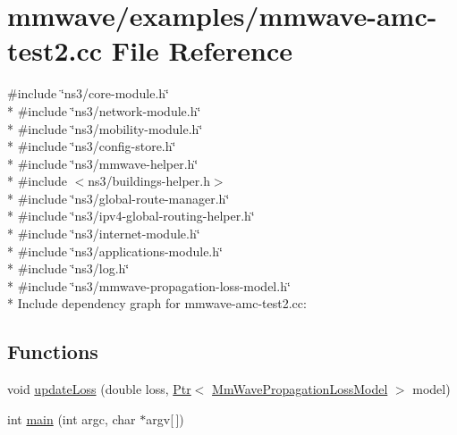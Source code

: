\hypertarget{mmwave-amc-test2_8cc}{}\section{mmwave/examples/mmwave-\/amc-\/test2.cc File Reference}
\label{mmwave-amc-test2_8cc}
{\ttfamily \#include \char`\"{}ns3/core-\/module.\+h\char`\"{}}\\*
{\ttfamily \#include \char`\"{}ns3/network-\/module.\+h\char`\"{}}\\*
{\ttfamily \#include \char`\"{}ns3/mobility-\/module.\+h\char`\"{}}\\*
{\ttfamily \#include \char`\"{}ns3/config-\/store.\+h\char`\"{}}\\*
{\ttfamily \#include \char`\"{}ns3/mmwave-\/helper.\+h\char`\"{}}\\*
{\ttfamily \#include $<$ns3/buildings-\/helper.\+h$>$}\\*
{\ttfamily \#include \char`\"{}ns3/global-\/route-\/manager.\+h\char`\"{}}\\*
{\ttfamily \#include \char`\"{}ns3/ipv4-\/global-\/routing-\/helper.\+h\char`\"{}}\\*
{\ttfamily \#include \char`\"{}ns3/internet-\/module.\+h\char`\"{}}\\*
{\ttfamily \#include \char`\"{}ns3/applications-\/module.\+h\char`\"{}}\\*
{\ttfamily \#include \char`\"{}ns3/log.\+h\char`\"{}}\\*
{\ttfamily \#include \char`\"{}ns3/mmwave-\/propagation-\/loss-\/model.\+h\char`\"{}}\\*
Include dependency graph for mmwave-\/amc-\/test2.cc\+:
\subsection*{Functions}
\begin{DoxyCompactItemize}
\item 
void \hyperlink{mmwave-amc-test2_8cc_adfea4867a62217f5e5e9a8ff5e69a5ad}{update\+Loss} (double loss, \hyperlink{classns3_1_1Ptr}{Ptr}$<$ \hyperlink{classMmWavePropagationLossModel}{Mm\+Wave\+Propagation\+Loss\+Model} $>$ model)
\item 
int \hyperlink{mmwave-amc-test2_8cc_a0ddf1224851353fc92bfbff6f499fa97}{main} (int argc, char $\ast$argv\mbox{[}$\,$\mbox{]})
\end{DoxyCompactItemize}

